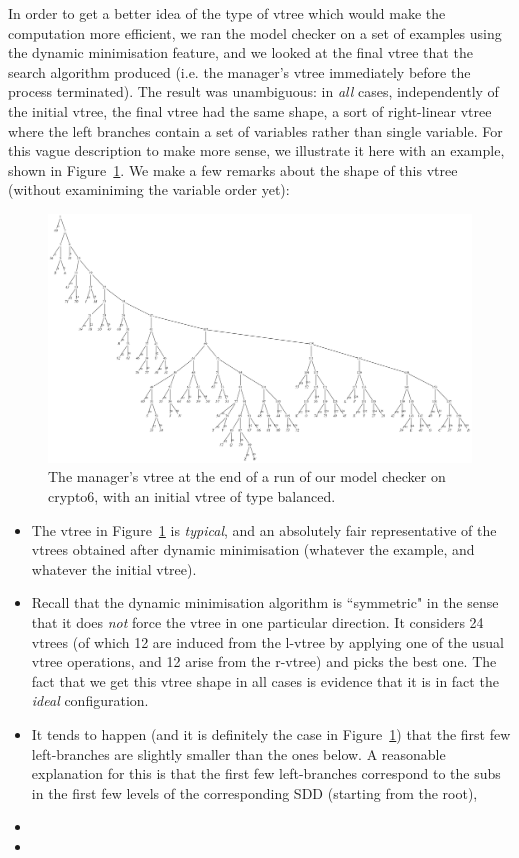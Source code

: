 \documentclass[11pt]{article}
\begin{document}
In order to get a better idea of the type of vtree which would make the computation more efficient, we ran the model checker on a set of examples using the dynamic minimisation feature, and we looked at the final vtree that the search algorithm produced (i.e. the manager's vtree immediately before the process terminated). The result was unambiguous: in \textit{all} cases, independently of the initial vtree, the final vtree had the same shape, a sort of right-linear vtree where the left branches contain a set of variables rather than single variable. For this vague description to make more sense, we illustrate it here with an example, shown in Figure~\ref{fig:large_vtree_after_reordering}. 
We make a few remarks about the shape of this vtree (without examiniming the variable order yet):
\begin{figure}
\includegraphics[scale=0.3]{largevtreeafterdao.png}
\caption{The manager's vtree at the end of a run of our model checker on crypto6, with an initial vtree of type balanced.}
\label{fig:large_vtree_after_reordering}
\end{figure}


\begin{itemize}
\item The vtree in Figure~\ref{fig:large_vtree_after_reordering} is \textit{typical}, and an absolutely fair representative of the vtrees obtained after dynamic minimisation (whatever the example, and whatever the initial vtree).
\item Recall that the dynamic minimisation algorithm is ``symmetric" in the sense that it does \textit{not} force the vtree in one particular direction. It considers 24 vtrees (of which 12 are induced from the l-vtree by applying one of the usual vtree operations, and 12 arise from the r-vtree) and picks the best one. The fact that we get this vtree shape in all cases is evidence that it is in fact the \textit{ideal} configuration. 
\item It tends to happen (and it is definitely the case in Figure~\ref{fig:large_vtree_after_reordering}) that the first few left-branches are slightly smaller than the ones below. A reasonable explanation for this is that the first few left-branches correspond to the subs in the first few levels of the corresponding SDD (starting from the root), 
\item 
\item 
\end{itemize}
\end{document}
